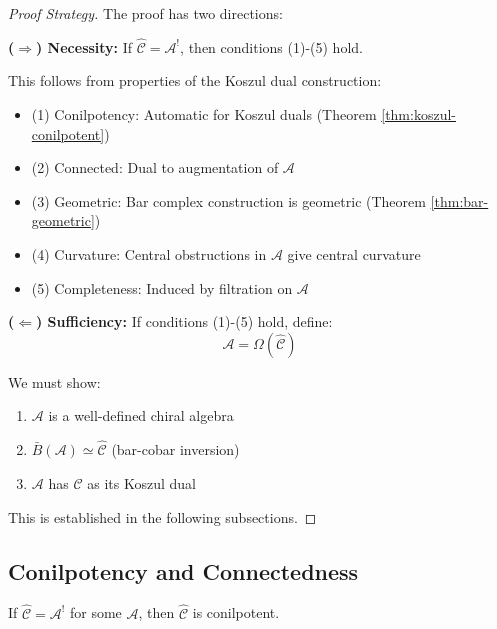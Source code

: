 \begin{proof}[Proof Strategy]
The proof has two directions:

\textbf{($\Rightarrow$) Necessity:} If $\widehat{\mathcal{C}} = \mathcal{A}^!$, 
then conditions (1)-(5) hold.

This follows from properties of the Koszul dual construction:
\begin{itemize}
\item (1) Conilpotency: Automatic for Koszul duals (Theorem \ref{thm:koszul-conilpotent})
\item (2) Connected: Dual to augmentation of $\mathcal{A}$
\item (3) Geometric: Bar complex construction is geometric (Theorem \ref{thm:bar-geometric})
\item (4) Curvature: Central obstructions in $\mathcal{A}$ give central curvature
\item (5) Completeness: Induced by filtration on $\mathcal{A}$
\end{itemize}

\textbf{($\Leftarrow$) Sufficiency:} If conditions (1)-(5) hold, define:
$$\mathcal{A} = \Omega(\widehat{\mathcal{C}})$$

We must show:
\begin{enumerate}
\item $\mathcal{A}$ is a well-defined chiral algebra
\item $\bar{B}(\mathcal{A}) \simeq \widehat{\mathcal{C}}$ (bar-cobar inversion)
\item $\mathcal{A}$ has $\widehat{\mathcal{C}}$ as its Koszul dual
\end{enumerate}

This is established in the following subsections.
\end{proof}

\subsection{Conilpotency and Connectedness}

\begin{lemma}\label{lem:conilpotency-necessary}
If $\widehat{\mathcal{C}} = \mathcal{A}^!$ for some $\mathcal{A}$, then $\widehat{\mathcal{C}}$ 
is conilpotent.
\end{lemma}

